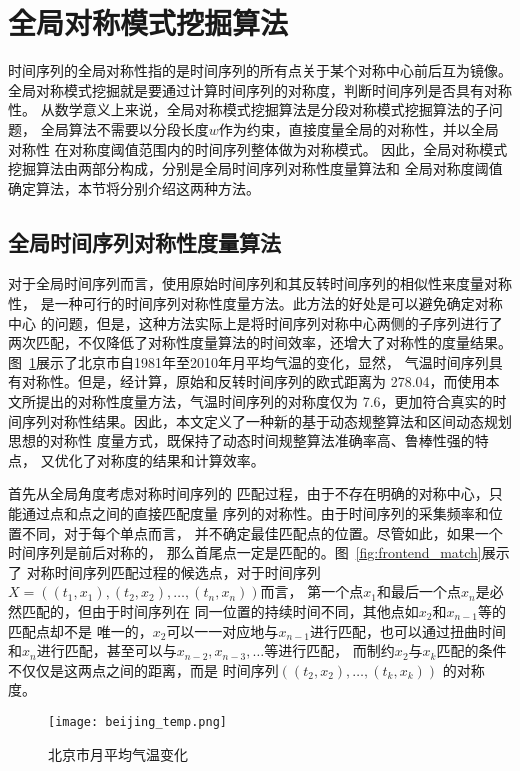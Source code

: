 \section{全局对称模式挖掘算法}
时间序列的全局对称性指的是时间序列的所有点关于某个对称中心前后互为镜像。
全局对称模式挖掘就是要通过计算时间序列的对称度，判断时间序列是否具有对称性。
从数学意义上来说，全局对称模式挖掘算法是分段对称模式挖掘算法的子问题，
全局算法不需要以分段长度$w$作为约束，直接度量全局的对称性，并以全局对称性
在对称度阈值范围内的时间序列整体做为对称模式。
因此，全局对称模式挖掘算法由两部分构成，分别是全局时间序列对称性度量算法和
全局对称度阈值确定算法，本节将分别介绍这两种方法。
\subsection{全局时间序列对称性度量算法}

对于全局时间序列而言，使用原始时间序列和其反转时间序列的相似性来度量对称性，
是一种可行的时间序列对称性度量方法。此方法的好处是可以避免确定对称中心
的问题，但是，这种方法实际上是将时间序列对称中心两侧的子序列进行了
两次匹配，不仅降低了对称性度量算法的时间效率，还增大了对称性的度量结果。
图~\ref{fig:beijing_temp}展示了北京市自1981年至2010年月平均气温的变化，显然，
气温时间序列具有对称性。但是，经计算，原始和反转时间序列的欧式距离为
278.04，而使用本文所提出的对称性度量方法，气温时间序列的对称度仅为
7.6，更加符合真实的时间序列对称性结果。因此，本文定义了一种新的基于动态规整算法和区间动态规划思想的对称性
度量方式，既保持了动态时间规整算法准确率高、鲁棒性强的特点，
又优化了对称度的结果和计算效率。

首先从全局角度考虑对称时间序列的
匹配过程，由于不存在明确的对称中心，只能通过点和点之间的直接匹配度量
序列的对称性。由于时间序列的采集频率和位置不同，对于每个单点而言，
并不确定最佳匹配点的位置。尽管如此，如果一个时间序列是前后对称的，
那么首尾点一定是匹配的。图~\ref{fig:frontend_match}展示了
对称时间序列匹配过程的候选点，对于时间序列
$X=\left(\left(t_1,x_1 \right),\left(t_2,x_2\right),\dots,
  \left(t_n,x_n \right)\right)$而言，
第一个点$x_1$和最后一个点$x_n$是必然匹配的，但由于时间序列在
同一位置的持续时间不同，其他点如$x_2$和$x_{n-1}$等的匹配点却不是
唯一的，$x_2$可以一一对应地与$x_{n-1}$进行匹配，也可以通过扭曲时间
和$x_n$进行匹配，甚至可以与$x_{n-2},x_{n-3},\dots$等进行匹配，
而制约$x_2$与$x_k$匹配的条件不仅仅是这两点之间的距离，而是
时间序列$\left(\left(t_2,x_2 \right),\dots,\left(t_k,x_k \right)\right)$
的对称度。
\begin{figure}
  \centering
  \texttt{[image: beijing\_temp.png]}
  \caption{北京市月平均气温变化}
  \label{fig:beijing_temp}
\end{figure}

